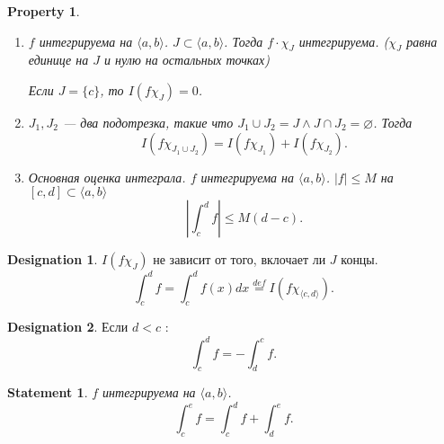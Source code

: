\documentclass[11pt]{book}
\newcommand{\slim}{\sum\limits}
\newcommand{\osc}{{\mathop{\text{\rm osc}}}}
\renewcommand{\le}{\leqslant}
\theoremstyle{definition}
\theoremstyle{plain}
\theoremstyle{plain}
\newtheorem*{st}{Statement}
\newtheorem*{prop}{Property}
\theoremstyle{definition}
\newtheorem*{name}{Designation}
\theoremstyle{remark}
\begin{document}
\begin{prop}
\begin{enumerate}
\begin{proof}
		Получаем \[
		    \begin{array}{c}
			\slim_{J \in  \Sigma} |J| \osc_J f \le  \varepsilon \\
			\slim_{J \in  \Sigma} |J| \osc_J g \le  \varepsilon
		    \end{array}
		.\]
		Тогда $ \forall  J \in  \Sigma: \osc_J (f g) \le  C \cdot \osc_J g + D \cdot \osc_J f$.

		Следовательно, \[
		    \slim_{J \in  \Sigma} |J| \cdot \osc_J fg \le C \cdot \slim_J |J| \cdot \osc_J g + D \cdot \slim_J | J| \cdot \osc_J f \le  (C + D ) \varepsilon
		.\]
	    \end{proof}
	\item
	    $ f$   интегрируема на $ \langle a, b \rangle$. $ J \subset  \langle a, b \rangle$.
	    Тогда $ f \cdot \chi_J $   интегрируема. ($ \chi_J$ равна единице на  $ J$ и нулю на остальных точках)

	    Если $ J = \{c\}$, то $ I(f \chi_J)  = 0$.
	\item $ J_1, J_2$ --- два подотрезка, такие что $ J_1 \cup  J_2 = J \wedge J \cap  J_2 = \varnothing$. Тогда
	    \[
		I(f \chi_{J_1 \cup J_2}) = I(f \chi_{J_1}) + I(f \chi _{J_2})
	    .\]
	\item Основная оценка интеграла.
	    $ f$   интегрируема на $ \langle a, b \rangle$.
	    $ |f | \le M$ на $ [c, d] \subset \langle a, b \rangle$
	    \[
		\left| \int_c ^{ d} f \right| \le  M(d-c)
	    .\]
    \end{enumerate}
\end{prop}
\begin{name}
    $ I(f \chi_J)$ не зависит от того, вклочает ли $ J$ концы.
    \[
	\int_c^{d} f  =  \int_c^{d} f(x) dx\stackrel{def} =  I(f \chi _ {\langle c, d \rangle})
    .\]
\end{name}
\begin{name}
    Если $ d < c$ :
    \[
	\int_c^{d} f = - \int_d ^{c} f
    .\]
\end{name}
\begin{st}
    $ f$   интегрируема на $ \langle a, b \rangle$.
    \[
	\int_c ^{e} f = \int _c^{ d} f+ \int_d ^{e} f
    .\]
\end{st}
\end{document}
